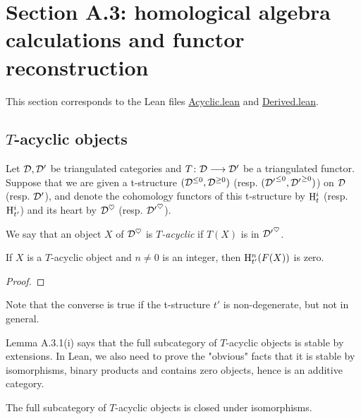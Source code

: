 \chapter{Section A.3: homological algebra calculations and functor reconstruction}

This section corresponds to the Lean files \url{Acyclic.lean} and \url{Derived.lean}.

\section{$T$-acyclic objects}

Let $\mathcal{D},\mathcal{D}'$ be triangulated categories and $T\colon \mathcal{D}\longrightarrow\mathcal{D}'$ be a triangulated functor. Suppose that we are given a t-structure 
$(\mathcal{D}^{\leq 0},\mathcal{D}^{\geq 0})$ (resp. $({\mathcal{D}'}^{\leq 0},{\mathcal{D}'}^{\geq 0})$) on $\mathcal{D}$ (resp. $\mathcal{D}'$), and denote the cohomology functors of 
this t-structure by $\mathrm{H}^i_t$ (resp. $\mathrm{H}^i_{t'}$) and its heart by $\mathcal{D}^\heartsuit$ (resp. ${\mathcal{D}'}^\heartsuit$).

\begin{definition}
\label{def-acyclic}

We say that an object $X$ of $\mathcal{D}^\heartsuit$ is \emph{$T$-acyclic} if $T(X)$ is in ${\mathcal{D}'}^\heartsuit$.

\end{definition}

\begin{lemma}
\label{prop-acyclic-H}
\leanok 
{}
If $X$ is a $T$-acyclic object and $n\ne 0$ is an integer, then $\mathrm{H}^n_{t'}(F(X))$ is zero.

\end{lemma}

\begin{proof}
\leanok
\end{proof}

Note that the converse is true if the t-structure $t'$ is non-degenerate, but not in general.

Lemma A.3.1(i) says that the full subcategory of $T$-acyclic objects is stable by extensions. In Lean, we 
also need to prove the "obvious" facts that it is stable by isomorphisms, binary products and contains zero objects,
hence is an additive category.

\begin{lemma}
\label{prop-acyclic-iso}
\leanok 
{}
The full subcategory of $T$-acyclic objects is closed under isomorphisms.

\end{lemma}

